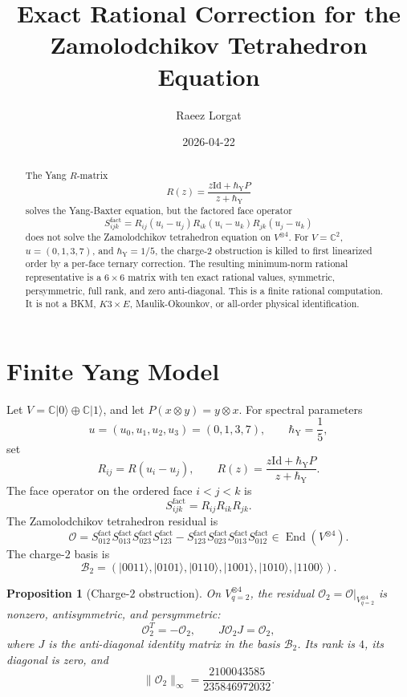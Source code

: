 \documentclass[11pt]{article}
\title{Exact Rational Correction for the Zamolodchikov Tetrahedron Equation}
\author{Raeez Lorgat}
\date{2026-04-22}
\newtheorem{proposition}[theorem]{Proposition}
\theoremstyle{remark}
\providecommand{\C}{\mathbb{C}}
\providecommand{\End}{\operatorname{End}}
\providecommand{\Id}{\mathrm{Id}}
\providecommand{\hbarY}{\hbar_{\mathrm{Y}}}
\providecommand{\cO}{\mathcal{O}}
\begin{document}
\maketitle

\begin{abstract}
The Yang \(R\)-matrix
\[
 R(z)=\frac{z\Id+\hbarY P}{z+\hbarY}
\]
solves the Yang-Baxter equation, but the factored face operator
\[
 S^{\mathrm{fact}}_{ijk}=R_{ij}(u_i-u_j)R_{ik}(u_i-u_k)R_{jk}(u_j-u_k)
\]
does not solve the Zamolodchikov tetrahedron equation on
\(V^{\otimes 4}\).  For \(V=\C^2\), \(u=(0,1,3,7)\), and
\(\hbarY=1/5\), the charge-\(2\) obstruction is killed to first
linearized order by a per-face ternary correction.  The resulting
minimum-norm rational representative is a \(6\times 6\) matrix with
ten exact rational values, symmetric, persymmetric, full rank, and
zero anti-diagonal.  This is a finite rational computation.  It is not
a BKM, \(K3\times E\), Maulik-Okounkov, or all-order physical
identification.
\end{abstract}

\tableofcontents

\section{Finite Yang Model}
\label{sec:finite-yang-model}

Let \(V=\C|0\rangle\oplus\C|1\rangle\), and let
\(P(x\otimes y)=y\otimes x\).  For spectral parameters
\[
 u=(u_0,u_1,u_2,u_3)=(0,1,3,7),
 \qquad \hbarY=\frac{1}{5},
\]
set
\[
 R_{ij}=R(u_i-u_j),\qquad
 R(z)=\frac{z\Id+\hbarY P}{z+\hbarY}.
\]
The face operator on the ordered face \(i<j<k\) is
\[
 S^{\mathrm{fact}}_{ijk}=R_{ij}R_{ik}R_{jk}.
\]
The Zamolodchikov tetrahedron residual is
\[
 \cO =
 S^{\mathrm{fact}}_{012}S^{\mathrm{fact}}_{013}
 S^{\mathrm{fact}}_{023}S^{\mathrm{fact}}_{123}
 -
 S^{\mathrm{fact}}_{123}S^{\mathrm{fact}}_{023}
 S^{\mathrm{fact}}_{013}S^{\mathrm{fact}}_{012}
 \in \End(V^{\otimes4}).
\]
The charge-\(2\) basis is
\[
\mathcal B_2=
(|0011\rangle,|0101\rangle,|0110\rangle,
 |1001\rangle,|1010\rangle,|1100\rangle).
\]

\begin{proposition}[Charge-\(2\) obstruction]
\label{prop:charge-two-obstruction}
On \(V^{\otimes4}_{q=2}\), the residual
\(\cO_2=\cO|_{V^{\otimes4}_{q=2}}\) is nonzero, antisymmetric, and
persymmetric:
\[
 \cO_2^T=-\cO_2,\qquad J\cO_2J=\cO_2,
\]
where \(J\) is the anti-diagonal identity matrix in the basis
\(\mathcal B_2\).  Its rank is \(4\), its diagonal is zero, and
\[
 \|\cO_2\|_\infty=\frac{2100043585}{235846972032}.
\]
\end{proposition}
\end{document}
